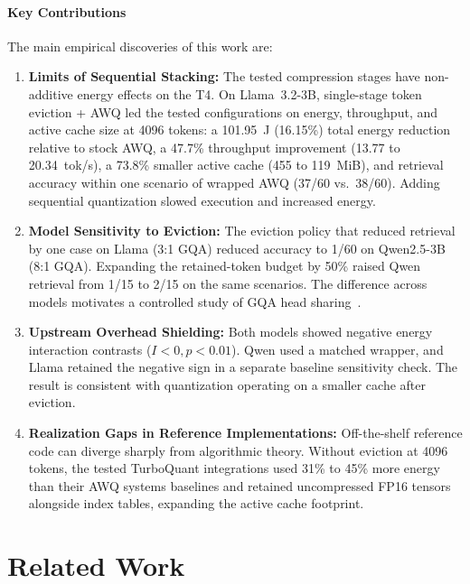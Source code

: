 \documentclass[conference,a4paper]{IEEEtran}
\begin{document}
\paragraph{Key Contributions}
The main empirical discoveries of this work are:
\begin{enumerate}
\item \textbf{Limits of Sequential Stacking:} The tested compression stages have non-additive energy effects on the T4. On Llama~3.2-3B, single-stage token eviction + AWQ led the tested configurations on energy, throughput, and active cache size at 4096 tokens: a 101.95~J (16.15\%) total energy reduction relative to stock AWQ, a 47.7\% throughput improvement (13.77 to 20.34~tok/s), a 73.8\% smaller active cache (455 to 119~MiB), and retrieval accuracy within one scenario of wrapped AWQ (37/60 vs.\ 38/60). Adding sequential quantization slowed execution and increased energy.
\item \textbf{Model Sensitivity to Eviction:} The eviction policy that reduced retrieval by one case on Llama (3:1 GQA) reduced accuracy to 1/60 on Qwen2.5-3B (8:1 GQA). Expanding the retained-token budget by 50\% raised Qwen retrieval from 1/15 to 2/15 on the same scenarios. The difference across models motivates a controlled study of GQA head sharing~\cite{ainslie2023gqa}.
\item \textbf{Upstream Overhead Shielding:} Both models showed negative energy interaction contrasts ($I < 0, p < 0.01$). Qwen used a matched wrapper, and Llama retained the negative sign in a separate baseline sensitivity check. The result is consistent with quantization operating on a smaller cache after eviction.
\item \textbf{Realization Gaps in Reference Implementations:} Off-the-shelf reference code can diverge sharply from algorithmic theory. Without eviction at 4096 tokens, the tested TurboQuant integrations used 31\% to 45\% more energy than their AWQ systems baselines and retained uncompressed FP16 tensors alongside index tables, expanding the active cache footprint.
\end{enumerate}

\section{Related Work}
\end{document}
